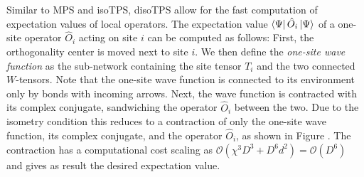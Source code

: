Similar to MPS and isoTPS, disoTPS allow for the fast computation of expectation values of local operators. The expectation value $\bra{\Psi}\hat{O}_i\ket{\Psi}$ of a one-site operator $\hat{O}_i$ acting on site $i$ can be computed as follows: First, the orthogonality center is moved next to site $i$. We then define the \textit{one-site wave function} as the sub-network containing the site tensor $T_i$ and the two connected $W$-tensors. Note that the one-site wave function is connected to its environment only by bonds with incoming arrows. Next, the wave function is contracted with its complex conjugate, sandwiching the operator $\hat{O}_i$ between the two. Due to the isometry condition this reduces to a contraction of only the one-site wave function, its complex conjugate, and the operator $\hat{O}_i$, as shown in Figure . The contraction has a computational cost scaling as $\mathcal{O}\left(\chi^3 D^3 + D^6d^2\right) = \mathcal{O}(D^6)$ and gives as result the desired expectation value. \par
